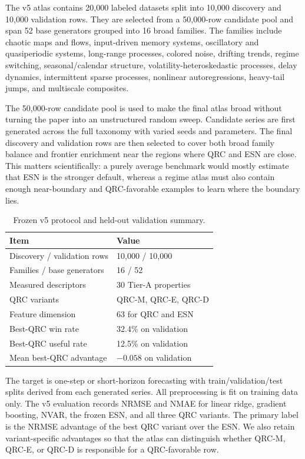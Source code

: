 The v5 atlas contains 20,000 labeled datasets split into 10,000 discovery and 10,000 validation rows. They are selected from a 50,000-row candidate pool and span 52 base generators grouped into 16 broad families. The families include chaotic maps and flows, input-driven memory systems, oscillatory and quasiperiodic systems, long-range processes, colored noise, drifting trends, regime switching, seasonal/calendar structure, volatility-heteroskedastic processes, delay dynamics, intermittent sparse processes, nonlinear autoregressions, heavy-tail jumps, and multiscale composites.

The 50,000-row candidate pool is used to make the final atlas broad without turning the paper into an unstructured random sweep. Candidate series are first generated across the full taxonomy with varied seeds and parameters. The final discovery and validation rows are then selected to cover both broad family balance and frontier enrichment near the regions where QRC and ESN are close. This matters scientifically: a purely average benchmark would mostly estimate that ESN is the stronger default, whereas a regime atlas must also contain enough near-boundary and QRC-favorable examples to learn where the boundary lies.

\begin{table}[!t]
\centering
\caption{Frozen v5 protocol and held-out validation summary.}
\label{tab:v5-summary}
\footnotesize
\setlength{\tabcolsep}{3.0pt}
\renewcommand{\arraystretch}{1.03}
\begin{tabularx}{\columnwidth}{@{}lX@{}}
\toprule
Item & Value \\
\midrule
Discovery / validation rows & 10,000 / 10,000 \\
Families / base generators & 16 / 52 \\
Measured descriptors & 30 Tier-A properties \\
QRC variants & QRC-M, QRC-E, QRC-D \\
Feature dimension & 63 for QRC and ESN \\
Best-QRC win rate & 32.4\% on validation \\
Best-QRC useful rate & 12.5\% on validation \\
Mean best-QRC advantage & \(-0.058\) on validation \\
\bottomrule
\end{tabularx}
\end{table}

The target is one-step or short-horizon forecasting with train/validation/test splits derived from each generated series. All preprocessing is fit on training data only. The v5 evaluation records NRMSE and NMAE for linear ridge, gradient boosting, NVAR, the frozen ESN, and all three QRC variants. The primary label is the NRMSE advantage of the best QRC variant over the ESN. We also retain variant-specific advantages so that the atlas can distinguish whether QRC-M, QRC-E, or QRC-D is responsible for a QRC-favorable row.

